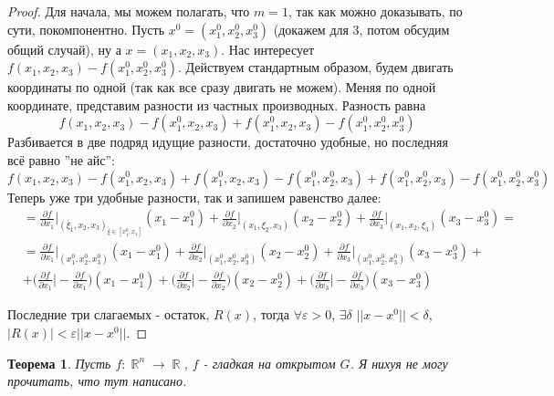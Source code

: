 \documentclass[a4paper,100pt]{article}
\theoremstyle{indented}
\newtheorem{theorem}{Теорема}
\theoremstyle{definition}
\theoremstyle{remark}
\DeclareMathOperator{\RR}{\mathbb{R}}
\begin{document}
\begin{proof}
    Для начала, мы можем полагать, что $m=1$, так как можно доказывать, по сути, покомпонентно. Пусть $x^0=(x_1^0, x_2^0, x_3^0)$ (докажем для 3, потом обсудим общий случай), ну а $x=(x_1, x_2, x_3)$. Нас интересует $f(x_1, x_2, x_3)-f(x_1^0, x_2^0, x_3^0)$. Действуем стандартным образом, будем двигать координаты по одной (так как все сразу двигать не можем). Меняя по одной координате, представим разности из частных производных. Разность равна 
    \[
        f(x_1, x_2, x_3)-f(x_1^0, x_2, x_3)+f(x_1^0, x_2, x_3)-f(x_1^0, x_2^0, x_3^0)
    \]
    Разбивается в две подряд идущие разности, достаточно удобные, но последняя всё равно ''не айс'':
    \[
        f(x_1, x_2, x_3)-f(x_1^0, x_2, x_3)+f(x_1^0, x_2, x_3)-f(x_1^0, x_2^0, x_3)+f(x_1^0, x_2^0, x_3)-f(x_1^0, x_2^0, x_3^0)
    \]
    Теперь уже три удобные разности, так и запишем равенство далее:
    \begin{equation*}
        \begin{aligned}
            &= \frac{\partial f}{\partial x_1}\bigg|_{(\xi_1, x_2, x_3)_{\xi\in [x_1^0, x_1]}}(x_1-x_1^0)+\frac{\partial f}{\partial x_2}\bigg|_{(x_1, \xi_2, x_3)}(x_2-x_2^0)+\frac{\partial f}{\partial x_3}\bigg|_{(x_1, x_2, \xi_3)}(x_3-x_3^0) = \\
            &= \frac{\partial f}{\partial x_1}\bigg|_{(x_1^0, x_2^0, x_3^0)}(x_1-x_1^0)+\frac{\partial f}{\partial x_2}\bigg|_{(x_1^0, x_2^0, x_3^0)}(x_2-x_2^0)+\frac{\partial f}{\partial x_3}\bigg|_{(x_1^0, x_2^0, x_3^0)}(x_3-x_3^0) + \\
            &+ \biggl(\frac{\partial f}{\partial x_1}\bigg| - \frac{\partial f}{\partial x_1}\biggr)(x_1-x_1^0)+\biggl(\frac{\partial f}{\partial x_2}\bigg| - \frac{\partial f}{\partial x_2}\biggr)(x_2-x_2^0)+\biggl(\frac{\partial f}{\partial x_3}\bigg| - \frac{\partial f}{\partial x_3}\biggr)(x_3-x_3^0)
        \end{aligned}
    \end{equation*}

    Последние три слагаемых - остаток, $R(x)$, тогда  $\forall \varepsilon >0$, $\exists \delta$ $||x-x^0||<\delta$, $|R(x)|<\varepsilon ||x-x^0||$. 


\end{proof}

\begin{theorem}
    Пусть $f:\RR^n\rightarrow \RR$, $f$ - гладкая на открытом $G$. Я нихуя не могу прочитать, что тут написано.
\end{theorem}
\end{document}
